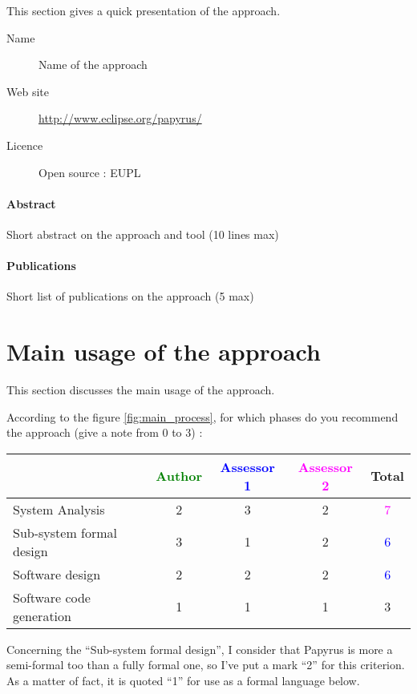 This section gives a quick presentation of the approach.

\begin{description}
\item[Name] Name of the approach
\item[Web site] \url{http://www.eclipse.org/papyrus/}
\item[Licence] Open source : EUPL
\end{description}

\paragraph{Abstract} Short abstract on the approach and tool (10 lines max)

\paragraph{Publications} Short list of publications on the approach (5 max)


\section{Main usage of the approach}
\label{main_usage}
This section discusses the main usage of the approach.

According to the figure \ref{fig:main_process}, for which phases do you recommend the approach (give a note from 0 to 3) :

\begin{tabular}{|l | c | c | c | c|}
\hline
& \textcolor{green}{Author} & \textcolor{blue}{Assessor 1} & \textcolor{magenta}{Assessor 2} & Total \\
\hline
System Analysis & 2    & 3    & 2    & \textcolor{magenta}{7} \\
\hline
Sub-system formal design & 3    & 1    & 2    & \textcolor{blue}{6} \\
\hline
Software design & 2    & 2    & 2    & \textcolor{blue}{6} \\
\hline
Software code generation & 1    & 1    & 1    & 3    \\
\hline
\end{tabular}

\begin{assessor1}
Concerning the "`Sub-system formal design"', I consider that Papyrus is more a semi-formal too than a fully formal one, so I've put a mark "`2"' for this criterion. 
As a matter of fact, it is quoted "`1"' for use as a formal language below. 
\end{assessor1}

